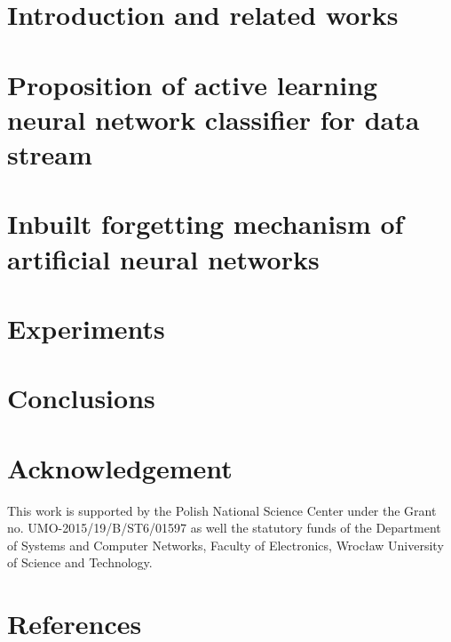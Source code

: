 \documentclass[preprint,10pt]{elsarticle}
\begin{document}


\section{Introduction and related works}
	\label{sec:intro}
	

\section{Proposition of active learning neural network classifier for data stream}
	\label{sec:desc}
	
    
\section{Inbuilt forgetting mechanism of artificial neural networks}
	\label{sec:inf}
	

\section{Experiments}
	\label{sec:exp}
	

\section{Conclusions}
	\label{sec:con}
	

\section*{Acknowledgement}
\noindent This work is supported by the Polish National Science Center under the Grant no. UMO-2015/19/B/ST6/01597 as well the statutory funds of the Department of Systems and Computer Networks, Faculty of Electronics, Wroc\l{}aw University of Science and Technology.

\section*{References}
	
	
\end{document}
